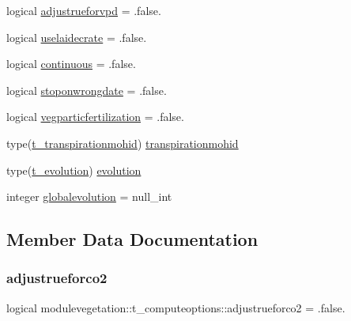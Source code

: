 \begin{DoxyCompactItemize}
\item 
logical \mbox{\hyperlink{structmodulevegetation_1_1t__computeoptions_ae06953defc7053f34ebcada0dda60281}{adjustrueforvpd}} = .false.
\item 
logical \mbox{\hyperlink{structmodulevegetation_1_1t__computeoptions_a4f7da1b122e87e5d00e24f154c3d56a2}{uselaidecrate}} = .false.
\item 
logical \mbox{\hyperlink{structmodulevegetation_1_1t__computeoptions_a43707fda5d1ec2a41709a4c20ad9d07c}{continuous}} = .false.
\item 
logical \mbox{\hyperlink{structmodulevegetation_1_1t__computeoptions_a5984099a9cb10a35b7736a7d7caa9c86}{stoponwrongdate}} = .false.
\item 
logical \mbox{\hyperlink{structmodulevegetation_1_1t__computeoptions_a4ff2df87f02adec97129229647085b3e}{vegparticfertilization}} = .false.
\item 
type(\mbox{\hyperlink{structmodulevegetation_1_1t__transpirationmohid}{t\+\_\+transpirationmohid}}) \mbox{\hyperlink{structmodulevegetation_1_1t__computeoptions_a68fbebecb7c8c97e8bd6e381b07ca0cf}{transpirationmohid}}
\item 
type(\mbox{\hyperlink{structmodulevegetation_1_1t__evolution}{t\+\_\+evolution}}) \mbox{\hyperlink{structmodulevegetation_1_1t__computeoptions_af2b53ff75a460e6d7268cac475506a80}{evolution}}
\item 
integer \mbox{\hyperlink{structmodulevegetation_1_1t__computeoptions_ae57ece8db98cdb7296a1179bb56853b5}{globalevolution}} = null\+\_\+int
\end{DoxyCompactItemize}


\subsection{Member Data Documentation}
\mbox{\label{structmodulevegetation_1_1t__computeoptions_a4e5faaa7bcbecb26ac447755e0bfc5ee}} 
\subsubsection{\texorpdfstring{adjustrueforco2}{adjustrueforco2}}
{\footnotesize\ttfamily logical modulevegetation\+::t\+\_\+computeoptions\+::adjustrueforco2 = .false.\hspace{0.3cm}{\ttfamily [private]}}

